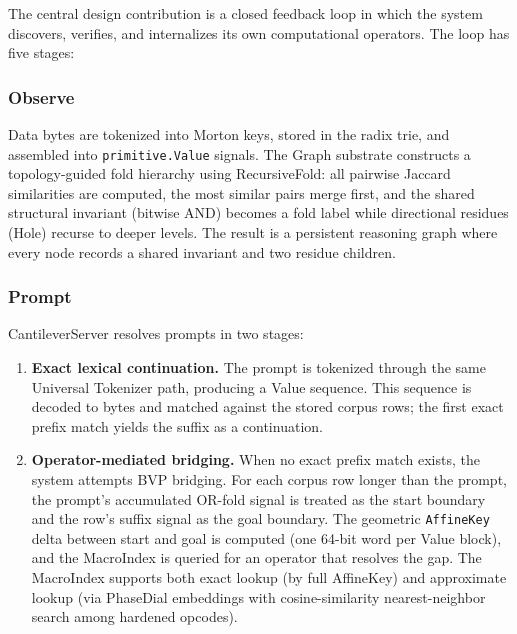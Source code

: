 The central design contribution is a closed feedback loop in which the
system discovers, verifies, and internalizes its own computational operators.
The loop has five stages:

\subsubsection{Observe}

Data bytes are tokenized into Morton keys, stored in the radix trie, and
assembled into \texttt{primitive.Value} signals.  The Graph substrate
constructs a topology-guided fold hierarchy using RecursiveFold: all pairwise
Jaccard similarities are computed, the most similar pairs merge first, and the
shared structural invariant (bitwise AND) becomes a fold label while
directional residues (Hole) recurse to deeper levels.  The result is a
persistent reasoning graph where every node records a shared invariant and
two residue children.

\subsubsection{Prompt}

CantileverServer resolves prompts in two stages:

\begin{enumerate}[nosep]
  \item \textbf{Exact lexical continuation.}  The prompt is tokenized through
        the same Universal Tokenizer path, producing a Value sequence.  This
        sequence is decoded to bytes and matched against the stored corpus
        rows; the first exact prefix match yields the suffix as a
        continuation.
  \item \textbf{Operator-mediated bridging.}  When no exact prefix match
        exists, the system attempts BVP bridging.  For each corpus row longer
        than the prompt, the prompt's accumulated OR-fold signal is treated as
        the start boundary and the row's suffix signal as the goal boundary.
        The geometric \texttt{AffineKey} delta between start and goal is
        computed (one 64-bit word per Value block), and the MacroIndex is
        queried for an operator that resolves the gap.  The MacroIndex
        supports both exact lookup (by full AffineKey) and approximate lookup
        (via PhaseDial embeddings with cosine-similarity nearest-neighbor
        search among hardened opcodes).
\end{enumerate}


